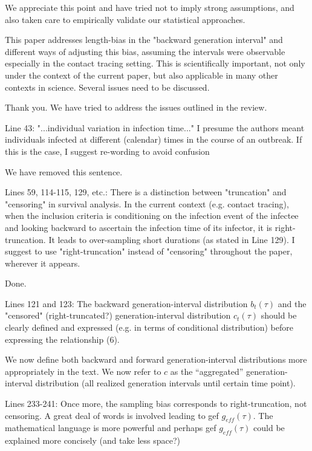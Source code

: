\documentclass[12pt]{article}
\newcommand{\revtext}{\textsf}
\begin{document}
We appreciate this point and have tried not to imply strong assumptions, and also taken care to empirically validate our statistical approaches.


\revtext{This paper addresses length-bias in the "backward generation interval" and
different ways of adjusting this bias, assuming the intervals were observable
especially in the contact tracing setting. This is scientifically important, not
only under the context of the current paper, but also applicable in many other
contexts in science. Several issues need to be discussed.}

Thank you. We have tried to address the issues outlined in the review.

\revtext{
Line 43: "...individual variation in infection time..." I presume the authors
meant individuals infected at different (calendar) times in the course of
an outbreak. If this is the case, I suggest re-wording to avoid confusion
}

We have removed this sentence.

\revtext{
Lines 59, 114-115, 129, etc.: There is a distinction between "truncation"
and "censoring" in survival analysis. In the current context (e.g. contact tracing), when the inclusion criteria is conditioning on the infection
event of the infectee and looking backward to ascertain the infection time
of its infector, it is right-truncation. It leads to over-sampling short durations (as stated in Line 129). I suggest to use "right-truncation" instead
of "censoring" throughout the paper, wherever it appears.
}

Done.

\revtext{
Lines 121 and 123: The backward generation-interval distribution $b_t(\tau)$ and
the "censored" (right-truncated?) generation-interval distribution $c_t(\tau)$
should be clearly defined and expressed (e.g. in terms of conditional distribution) before expressing the relationship (6).
}

We now define both backward and forward generation-interval distributions more appropriately in the text.
We now refer to $c$ as the ``aggregated'' generation-interval distribution (all realized generation intervals until certain time point).

\revtext{
Lines 233-241: Once more, the sampling bias corresponds to right-truncation,
not censoring. A great deal of words is involved leading to gef $g_{eff}(\tau)$. The
mathematical language is more powerful and perhaps gef $g_{eff}(\tau)$ could be
explained more concisely (and take less space?)
}
\end{document}

